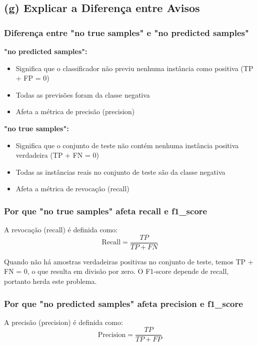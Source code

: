 \documentclass[12pt,a4paper]{article}
\begin{document}
\subsection{(g) Explicar a Diferença entre Avisos}

\subsubsection{Diferença entre "no true samples" e "no predicted samples"}

\textbf{"no predicted samples":}
\begin{itemize}
    \item Significa que o classificador não previu nenhuma instância como positiva (TP + FP = 0)
    \item Todas as previsões foram da classe negativa
    \item Afeta a métrica de precisão (precision)
\end{itemize}

\textbf{"no true samples":}
\begin{itemize}
    \item Significa que o conjunto de teste não contém nenhuma instância positiva verdadeira (TP + FN = 0)
    \item Todas as instâncias reais no conjunto de teste são da classe negativa
    \item Afeta a métrica de revocação (recall)
\end{itemize}

\subsubsection{Por que "no true samples" afeta recall e f1\_score}

A revocação (recall) é definida como:
\begin{equation}
\text{Recall} = \frac{TP}{TP + FN}
\end{equation}

Quando não há amostras verdadeiras positivas no conjunto de teste, temos TP + FN = 0, o que resulta em divisão por zero. O F1-score depende de recall, portanto herda este problema.

\subsubsection{Por que "no predicted samples" afeta precision e f1\_score}

A precisão (precision) é definida como:
\begin{equation}
\text{Precision} = \frac{TP}{TP + FP}
\end{equation}
\end{document}
